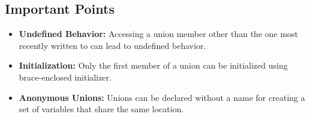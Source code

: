 \documentclass{report}
\begin{document}
    \subsection{Important Points}
    \begin{itemize}
        \item \textbf{Undefined Behavior:} Accessing a union member other than the one most recently written to can lead to undefined behavior.
        \item \textbf{Initialization:} Only the first member of a union can be initialized using brace-enclosed initializer.
        \item \textbf{Anonymous Unions:} Unions can be declared without a name for creating a set of variables that share the same location.
    \end{itemize}

    \bigbreak \noindent 
\end{document}
